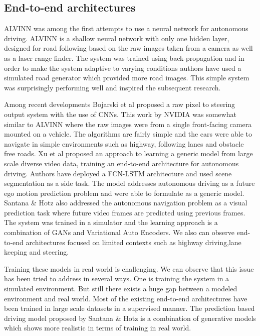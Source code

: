 \subsection{End-to-end architectures}

ALVINN \cite{pomerleau1989alvinn} was among the first attempts to use a neural network for autonomous driving. ALVINN is a shallow neural network with only one hidden layer, designed for road following based on the raw images taken from a camera as well as a laser range finder. The system was trained using back-propagation\cite{rumelhart1986learning} and in order to make the system adaptive to varying conditions authors have used a simulated road generator which provided more road images. This simple system was surprisingly performing well and inspired the subsequent research. 

Among recent developments Bojarski et al\cite{bojarski2016end} proposed a raw pixel to steering output system with the use of CNNs. This work by NVIDIA was somewhat similar to ALVINN where the raw images were from a single front-facing camera mounted on a vehicle. The algorithms are fairly simple and the cars were able to navigate in simple environments such as highway, following lanes and obstacle free roads. Xu et al \cite{xu2016end} proposed an approach to learning a generic model from large scale diverse video data, training an end-to-end architecture for autonomous driving. Authors have deployed a FCN-LSTM architecture and used scene segmentation as a side task. The model addresses autonomous driving as a future ego motion prediction problem and were able to formulate as a generic model. Santana \& Hotz\cite{SantanaH16} also addressed the autonomous navigation problem as a visual prediction task where future video frames are predicted using previous frames. The system was trained in a simulator and the learning approach is a combination of GANs and Variational Auto Encoders\cite{kingma2013auto}. We also can observe end-to-end architectures focused on limited contexts such as highway driving\cite{huval2015empirical},lane keeping\cite{chen2017end} and steering\cite{bojarski2017explaining}. 

Training these models in real world is challenging. We can observe that this issue has been tried to address in several ways. One is training the system in a simulated environment\cite{SantanaH16,abbeel2004apprenticeship,lillicrap2015continuous}. But still there exists a huge gap between a modeled environment and real world. Most of the existing end-to-end architectures have been trained in large scale datasets in a supervised manner\cite{pomerleau1989alvinn,bojarski2016end,xu2016end}. The prediction based driving model proposed by Santana \& Hotz\cite{SantanaH16} is a combination of generative models which shows more realistic in terms of training in real world.

